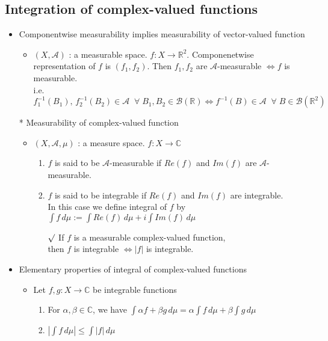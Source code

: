 \documentclass[12pt]{article}
\newcommand{\rmk}{$\surd$}
\newcommand{\R}{\mathbb{R}}
\newcommand{\A}{\mathcal{A}}
\newcommand{\Borel}{\mathcal{B}(\mathbb{R})}
\newcommand{\forany}{\; \forall \;}
\begin{document}
\subsection{Integration of complex-valued functions}
\smallskip
\begin{itemize}
    \item Componentwise measurability implies measurability of vector-valued function
    \begin{itemize}
        \item $(X, \A)$ : a measurable space. $f:X\rightarrow \R^2$. Componenetwise representation of $f$ is $(f_1, f_2)$. Then $f_1, f_2$ are $\A$-measurable $\Leftrightarrow f$ is measurable. \\ i.e. \;$f_1^{-1}(B_1),\, f_2^{-1}(B_2)\in \A \;\forany B_1, B_2\in \Borel \Leftrightarrow f^{-1}(B)\in \A \;\forany B\in \mathcal{B}(\R^2)$
    \end{itemize}
    \item[*] Measurability of complex-valued function
    \begin{itemize}
        \item $(X, \A, \mu)$ : a measure space. $f:X\rightarrow \mathbb{C}$
        \begin{enumerate}
            \item $f$ is said to be $\A$-measurable if $Re(f)$ and $Im(f)$ are $\A$-measurable.
            \item $f$ is said to be integrable if $Re(f)$ and $Im(f)$ are integrable. \\In this case we define integral of $f$ by $\int f\, d\mu := \int Re(f)\, d\mu + i\int Im(f)\,d\mu$
            \item[\rmk]  If $f$ is a measurable complex-valued function,\\ then $f$ is integrable $\Leftrightarrow |f|$ is integrable.
        \end{enumerate}
    \end{itemize}
    \item Elementary properties of integral of complex-valued functions
    \begin{itemize}
        \item Let $f,g : X\rightarrow \mathbb{C}$ be integrable functions
        \begin{enumerate}
            \item For $\alpha, \beta \in \mathbb{C}$, we have $\int \alpha f +\beta g \, d\mu = \alpha \int f \, d\mu + \beta \int g\, d\mu$
            \item $|\int f\, d\mu|\leq \int |f| \, d\mu$

\end{enumerate}
\end{itemize}
\end{itemize}
\end{document}
